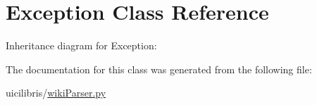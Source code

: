 \hypertarget{classException}{\section{\-Exception \-Class \-Reference}
\label{classException}
}


\-Inheritance diagram for \-Exception\-:


\-The documentation for this class was generated from the following file\-:\begin{DoxyCompactItemize}
\item 
uicilibris/\hyperlink{wikiParser_8py}{wiki\-Parser.\-py}\end{DoxyCompactItemize}

